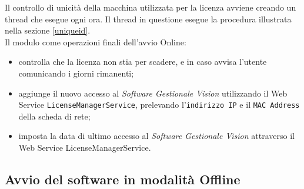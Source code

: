 Il controllo di unicità della macchina utilizzata per la licenza avviene creando un \gls{thread} che esegue ogni ora. Il thread in questione esegue la procedura illustrata nella sezione \ref{uniqueid}.\\

Il modulo come operazioni finali dell’avvio Online: 
\begin{itemize}

\item controlla che la licenza non stia per scadere, e in caso avvisa l’utente comunicando i giorni rimanenti;
\item aggiunge il nuovo accesso al \textit{Software Gestionale Vision} utilizzando il Web Service \texttt{LicenseManagerService}, prelevando l'\texttt{indirizzo IP} e il \texttt{MAC Address} della scheda di rete;
\item imposta la data di ultimo accesso al \textit{Software Gestionale Vision} attraverso il Web Service LicenseManagerService.

\end{itemize}

\subsection{Avvio del software in modalità Offline}
\label{off}

